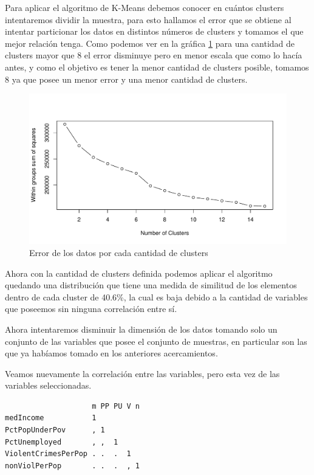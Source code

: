 \documentclass[a4paper,10pt,twocolumn]{article}
\begin{document}
	Para aplicar el algoritmo de K-Means debemos conocer en cuántos clusters intentaremos dividir la muestra, para esto hallamos el error que se obtiene al intentar particionar los datos en distintos números de clusters y tomamos el que mejor relación tenga. Como podemos ver en la gráfica \ref{fig:cluster_n_1} para una cantidad de clusters mayor que 8 el error disminuye pero en menor escala que como lo hacía antes, y como el objetivo es tener la menor cantidad de clusters posible, tomamos 8 ya que posee un menor error y una menor cantidad de clusters.

	\begin{figure}[htb]
		\begin{center}
			\includegraphics[width=\columnwidth]{figures/cluster_n_1.pdf}
		\end{center}
		\caption{Error de los datos por cada cantidad de clusters \label{fig:cluster_n_1}}%
	\end{figure}

	Ahora con la cantidad de clusters definida podemos aplicar el algoritmo quedando una distribución que tiene una medida de similitud de los elementos dentro de cada cluster de 40.6\%, la cual es baja debido a la cantidad de variables que poseemos sin ninguna correlación entre sí.

	Ahora intentaremos disminuir la dimensión de los datos tomando solo un conjunto de las variables que posee el conjunto de muestras, en particular son las que ya habíamos tomado en los anteriores acercamientos.

	Veamos nuevamente la correlación entre las variables, pero esta vez de las variables seleccionadas.

	\begin{verbatim}
                    m PP PU V n
medIncome           1          
PctPopUnderPov      , 1        
PctUnemployed       , ,  1     
ViolentCrimesPerPop . .  .  1  
nonViolPerPop       . .  .  , 1
	\end{verbatim}
\end{document}
